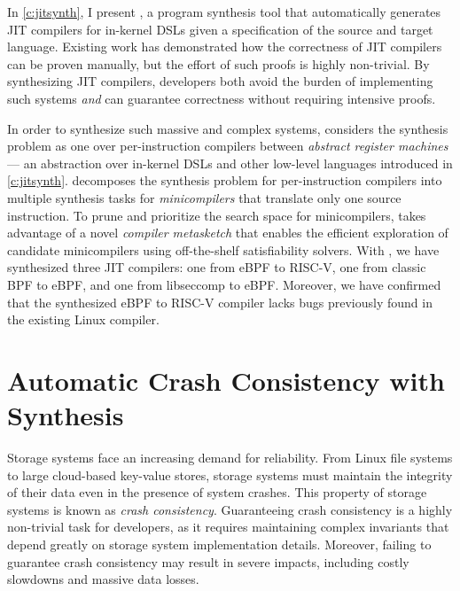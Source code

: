 In \cref{c:jitsynth}, I present \jitsynth, a program synthesis tool that
automatically generates JIT compilers for in-kernel DSLs
given a specification of the source and target language.
Existing work has demonstrated how the correctness of JIT compilers
can be proven manually\cite{wang:jitk,sobel:ejitk},
but the effort of such proofs is highly non-trivial.
By synthesizing JIT compilers, developers both avoid the burden of implementing
such systems \textit{and} can guarantee correctness
without requiring intensive proofs.

In order to synthesize such massive and complex systems,
\jitsynth considers the synthesis problem as one over per-instruction compilers
between \textit{abstract register machines} --- an abstraction over
in-kernel DSLs and other low-level languages introduced in \cref{c:jitsynth}.
\jitsynth decomposes the synthesis problem for per-instruction compilers
into multiple synthesis tasks for \textit{minicompilers}
that translate only one source instruction. %
To prune and prioritize the search space for minicompilers,
\jitsynth takes advantage of a novel \textit{compiler metasketch}
that enables the efficient exploration of candidate minicompilers
using off-the-shelf satisfiability solvers.
With \jitsynth, we have synthesized three JIT compilers:
one from eBPF to RISC-V,
one from classic BPF to eBPF,
and one from libseccomp to eBPF.
Moreover, we have confirmed that the synthesized eBPF to RISC-V compiler
lacks bugs previously found in the existing Linux compiler.

\section{Automatic Crash Consistency with Synthesis}
Storage systems face an increasing demand for reliability.
From Linux file systems to large cloud-based key-value stores,
storage systems must maintain the integrity of their data
even in the presence of system crashes.
This property of storage systems is known as \textit{crash consistency}.
Guaranteeing crash consistency is a highly non-trivial task for developers,
as it requires maintaining complex invariants that depend greatly on
storage system implementation details.
Moreover, failing to guarantee crash consistency may result in severe impacts,
including costly slowdowns and massive data losses. %

